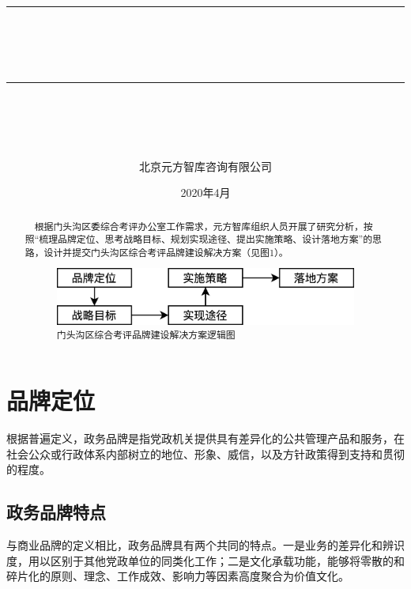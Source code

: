 \documentclass[12pt]{article} %
\newcommand{\horrule}[1]{\rule[0.5ex]{\linewidth}{#1}} 	%
\begin{document}
\title{
\horrule{0.5pt}\\
\horrule{1.8pt}\\[20pt]
}
\author{北京元方智库咨询有限公司}
\date{2020年4月} %

\begin{titlepage}
\maketitle
\vspace{30pt}
\begin{abstract}
\normalsize \ \ 根据门头沟区委综合考评办公室工作需求，元方智库组织人员开展了研究分析，按照“梳理品牌定位、思考战略目标、规划实现途径、提出实施策略、设计落地方案”的思路，设计并提交门头沟区综合考评品牌建设解决方案（见图1）。\\[5pt]
\begin{figure}[ht]
\centering
\includegraphics[width=\textwidth]{figures/1.png}
\caption{门头沟区综合考评品牌建设解决方案逻辑图}
\label{fig:fig1}
\end{figure}
\end{abstract}
\thispagestyle{empty}
\end{titlepage}

\tableofcontents
\thispagestyle{empty}

\newpage
\setcounter{page}{1}

\section{品牌定位}
根据普遍定义，政务品牌是指党政机关提供具有差异化的公共管理产品和服务，在社会公众或行政体系内部树立的地位、形象、威信，以及方针政策得到支持和贯彻的程度。

\subsection{政务品牌特点}
与商业品牌的定义相比，政务品牌具有两个共同的特点。一是业务的差异化和辨识度，用以区别于其他党政单位的同类化工作；二是文化承载功能，能够将零散的和碎片化的原则、理念、工作成效、影响力等因素高度聚合为价值文化。
\end{document}
